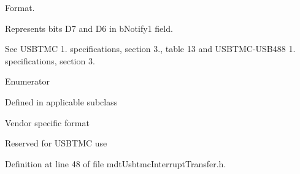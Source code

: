 Format. 

Represents bits D7 and D6 in b\-Notify1 field.

See U\-S\-B\-T\-M\-C 1. specifications, section 3., table 13 and U\-S\-B\-T\-M\-C-\/\-U\-S\-B488 1. specifications, section 3. \begin{Desc}
\item[Enumerator]\par
\begin{description}
\item[{\em 
\hypertarget{classmdt_usbtmc_interrupt_transfer_ae547608f6ca182cc8312a8f4cbf8b2f1aaee92af542a084a7454b6871fa5d9eeb}{Subclass}\label{classmdt_usbtmc_interrupt_transfer_ae547608f6ca182cc8312a8f4cbf8b2f1aaee92af542a084a7454b6871fa5d9eeb}
}]Defined in applicable subclass \item[{\em 
\hypertarget{classmdt_usbtmc_interrupt_transfer_ae547608f6ca182cc8312a8f4cbf8b2f1a4cc449f0ef9a4d1671ae565a323d06c1}{Vendor\-Specific}\label{classmdt_usbtmc_interrupt_transfer_ae547608f6ca182cc8312a8f4cbf8b2f1a4cc449f0ef9a4d1671ae565a323d06c1}
}]Vendor specific format \item[{\em 
\hypertarget{classmdt_usbtmc_interrupt_transfer_ae547608f6ca182cc8312a8f4cbf8b2f1a7dec96c555a3a0b814a35584fa1e320f}{Usbtmc}\label{classmdt_usbtmc_interrupt_transfer_ae547608f6ca182cc8312a8f4cbf8b2f1a7dec96c555a3a0b814a35584fa1e320f}
}]Reserved for U\-S\-B\-T\-M\-C use \end{description}
\end{Desc}


Definition at line 48 of file mdt\-Usbtmc\-Interrupt\-Transfer.\-h.



